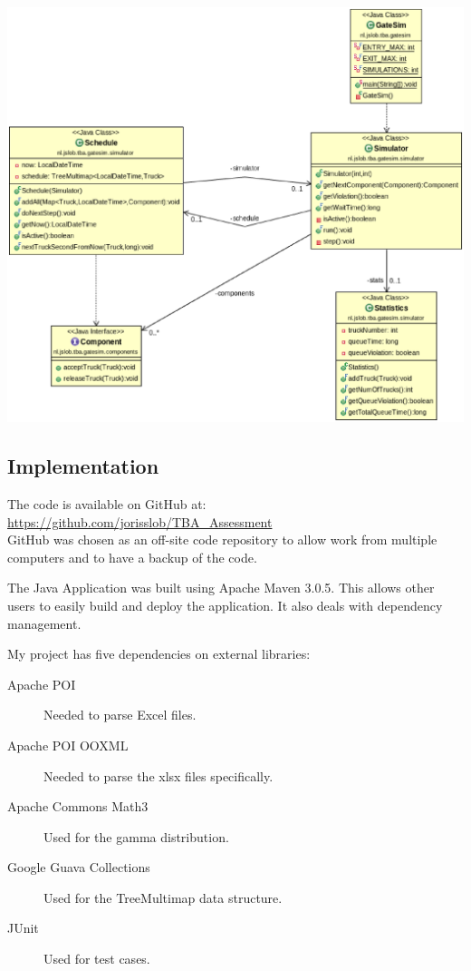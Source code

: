 \documentclass{article}
\begin{document}
\includegraphics[scale=0.4]{Simulator.eps}

\pagebreak
\subsection{Implementation}

The code is available on GitHub at:\\ 
\url{https://github.com/jorisslob/TBA_Assessment}\\ 
GitHub was chosen as an off-site code repository to allow work from
multiple computers and to have a backup of the code.

The Java Application was built using Apache Maven 3.0.5. This allows
other users to easily build and deploy the application. It also deals
with dependency management.

\begin{samepage}
My project has five dependencies on external libraries:
\begin{description}
\item[Apache POI] Needed to parse Excel files.
\item[Apache POI OOXML] Needed to parse the xlsx files specifically.
\item[Apache Commons Math3] Used for the gamma distribution.
\item[Google Guava Collections] Used for the TreeMultimap data structure.
\item[JUnit] Used for test cases.
\end{description}
\end{samepage}
\end{document}
